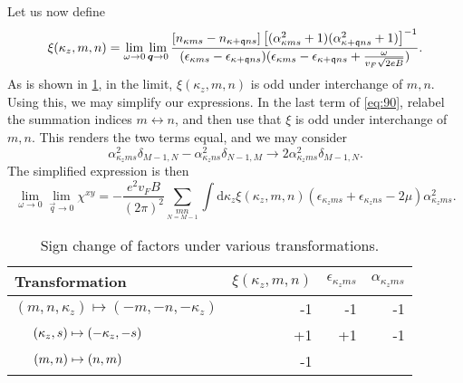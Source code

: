 Let us now define
\begin{equation}
  \xi(\kappa_z, m, n) =
  \lim_{\omega\to0} \lim_{\bm{q} \to 0}
  \frac{[n_{\kappa ms} - n_{\kappa + \mathfrak{q} ns}]
  \left[ (\alpha_{\kappa ms}^2 + 1) (\alpha_{\kappa +\mathfrak{q} ns}^2 + 1) \right]^{-1}
  }{
    (\epsilon _{\kappa m s} - \epsilon _{\kappa +\mathfrak{q}ns} )
    (\epsilon _{\kappa m s} - \epsilon _{\kappa +\mathfrak{q}ns} + \frac{ \omega }{v_F \sqrt{2 e B  }} )
  }.
\end{equation}
As is shown in \cref{tab:transform-sign}, in the limit, \( \xi(\kappa_z, m, n) \) is odd under interchange of \( m,n \).
Using this, we may simplify our expressions.
In the last term of \cref{eq:90}, relabel the summation indices \( m \leftrightarrow n \), and then use that \( \xi \) is odd under interchange of \( m,n \).
This renders the two terms equal, and we may consider
\[
\alpha_{\kappa_z m s}^2 \delta_{M-1,N} - \alpha_{\kappa_z n s}^2 \delta_{N-1, M} \to 2 \alpha_{\kappa_z m s}^2 \delta_{M-1, N}.
\]
The simplified expression is then
\begin{equation}
  \label{eq:91}
  \lim_{\omega \to 0} \lim_{\vec{q} \to 0} \chi^{xy} =
  -\frac{e^2 v_F B}{(2 \pi)^2} \sum\limits_{\underset{N=M-1}{mn}}
  \int \mathrm{d}\kappa_z \xi(\kappa_z, m, n)
  (\epsilon_{\kappa_z m s} + \epsilon_{\kappa_z n s} - 2 \mu) \alpha_{\kappa_z m s}^2.
\end{equation}

\begin{table}[ht]
  \centering
  \caption{Sign change of factors under various transformations.\label{tab:transform-sign}}
  \begin{tabular}{l r r r}
    \toprule
    Transformation & \( \xi(\kappa_z, m, n) \) & \( \epsilon_{\kappa_z m s} \) & \( \alpha_{\kappa_z m s} \)\\
    \midrule
    \( (m, n, \kappa_z) \mapsto (-m, -n, -\kappa_z) \) & -1 & -1 & -1\\
    \( \hphantom{(m, n, \kappa_z)}\mathllap{(\kappa_z, s)} \mapsto (-\kappa_z, -s) \) & +1 & +1 & -1\\
    \(  \hphantom{(m, n, \kappa_z)}\mathllap{ (m, n)} \mapsto (n, m)\) & -1 &&\\
    \bottomrule
  \end{tabular}
\end{table}

